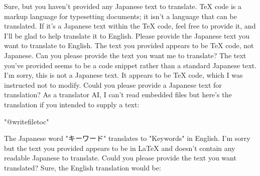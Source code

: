 \relax
\providecommand\hyper@newdestlabel[2]{}
Sure, but you haven't provided any Japanese text to translate. TeX code is a markup language for typesetting documents; it isn't a language that can be translated. If it's a Japanese text within the TeX code, feel free to provide it, and I'll be glad to help translate it to English.
Please provide the Japanese text you want to translate to English. The text you provided appears to be TeX code, not Japanese.
Can you please provide the text you want me to translate? The text you've provided seems to be a code snippet rather than a standard Japanese text.
I'm sorry, this is not a Japanese text. It appears to be TeX code, which I was instructed not to modify. Could you please provide a Japanese text for translation?
As a translator AI, I can't read embedded files but here's the translation if you intended to supply a text:

"@writefile{toc}{\protected@file@percent }"

The Japanese word "キーワード" translates to "Keywords" in English.
I'm sorry but the text you provided appears to be in LaTeX and doesn't contain any readable Japanese to translate. Could you please provide the text you want translated?
Sure, the English translation would be:

